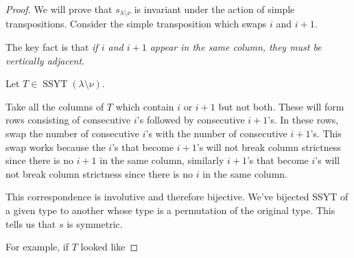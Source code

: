 \documentclass{article}
\DeclareMathOperator{\SSYT}{SSYT}
\begin{document}
\begin{proof}
    We will prove that $s_{\lambda\setminus\nu}$ is invariant under the action of simple transpositions. Consider the simple transposition which swaps $i$ and $i+1$. 

    The key fact is that \textit{if $i$ and $i+1$ appear in the same column, they must be vertically adjacent}.

    Let $T\in\SSYT(\lambda \setminus \nu)$. 

    Take all the columns of $T$ which contain $i$ or $i+1$ but not both. 
    These will form rows consisting of consecutive $i$'s followed by consecutive $i+1$'s. 
    In these rows, swap the number of consecutive $i$'s with the number of consecutive $i+1$'s. 
    This swap works because the $i$'s that become $i+1$'s will not break column strictness since there is no $i+1$ in the same column, similarly $i+1$'s that become $i$'s will not break column strictness since there is no $i$ in the same column.

    This correspondence is involutive and therefore bijective. 
    We've bijected SSYT of a given type to another whose type is a permutation of the original type.
    This tells us that $s$ is symmetric.

    For example, if $T$ looked like


\end{proof}
\end{document}
